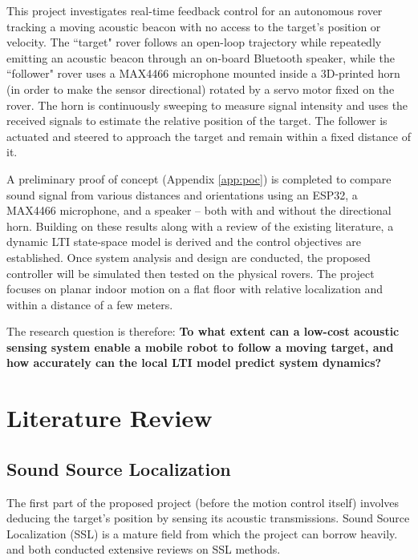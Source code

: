 \documentclass[journal,a4paper]{IEEEtran}
\begin{document}
This project investigates real-time feedback control for an autonomous rover tracking a moving acoustic beacon with no access to the target's position or velocity. The ``target" rover follows an open-loop trajectory while repeatedly emitting an acoustic beacon through an on-board Bluetooth speaker, while the ``follower" rover uses a MAX4466 microphone mounted inside a 3D-printed horn (in order to make the sensor directional) rotated by a servo motor fixed on the rover. The horn is continuously sweeping to measure signal intensity and uses the received signals to estimate the relative position of the target. The follower is actuated and steered to approach the target and remain within a fixed distance of it.

A preliminary proof of concept (Appendix  \ref{app:poc}) is completed to compare sound signal from various distances and orientations using an ESP32, a MAX4466 microphone, and a speaker -- both with and without the directional horn. Building on these results along with a review of the existing literature, a dynamic LTI state-space model is derived and the control objectives are established. Once system analysis and design are conducted, the proposed controller will be simulated then tested on the physical rovers. The project focuses on planar indoor motion on a flat floor with relative localization and within a distance of a few meters.

The research question is therefore: \textbf{To what extent can a low-cost acoustic sensing system enable a mobile robot to follow a moving target, and how accurately can the local LTI model predict system dynamics?}

\section{Literature Review}
\subsection{Sound Source Localization}

The first part of the proposed project (before the motion control itself) involves deducing the target's position by sensing its acoustic transmissions. Sound Source Localization (SSL) is a mature field from which the project can borrow heavily. \citet{rascon2017review} and
\citet{argentieri2015survey} both conducted extensive reviews on SSL methods.
\end{document}
